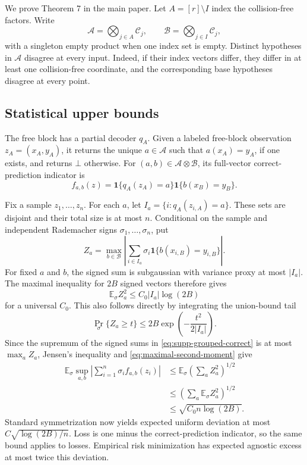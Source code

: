 \documentclass[twoside]{article}
\newcommand{\E}{\mathbb E}
\newcommand{\C}{\mathcal C}
\begin{document}
We prove Theorem 7 in the main paper. Let $A=[r]\setminus I$ index the collision-free factors. Write
\[
 \mathcal A=\bigotimes_{j\in A}\C_j,
 \qquad
 \mathcal B=\bigotimes_{j\in I}\C_j,
\]
with a singleton empty product when one index set is empty. Distinct hypotheses in $\mathcal A$ disagree at every input. Indeed, if their index vectors differ, they differ in at least one collision-free coordinate, and the corresponding base hypotheses disagree at every point.

\subsection{Statistical upper bounds}

The free block has a partial decoder $q_A$. Given a labeled free-block observation $z_A=(x_A,y_A)$, it returns the unique $a\in\mathcal A$ such that $a(x_A)=y_A$, if one exists, and returns $\bot$ otherwise. For $(a,b)\in\mathcal A\otimes\mathcal B$, its full-vector correct-prediction indicator is
\begin{equation}
 f_{a,b}(z)=\mathbf1\{q_A(z_A)=a\}\mathbf1\{b(x_B)=y_B\}.
 \label{eq:supp-grouped-correct}
\end{equation}

Fix a sample $z_1,\ldots,z_n$. For each $a$, let $I_a=\{i:q_A(z_{i,A})=a\}$. These sets are disjoint and their total size is at most $n$. Conditional on the sample and independent Rademacher signs $\sigma_1,\ldots,\sigma_n$, put
\[
 Z_a=\max_{b\in\mathcal B}
 \left|\sum_{i\in I_a}\sigma_i
 \mathbf1\{b(x_{i,B})=y_{i,B}\}\right|.
\]
For fixed $a$ and $b$, the signed sum is subgaussian with variance proxy at most $|I_a|$. The maximal inequality for $2B$ signed vectors therefore gives
\begin{equation}
 \E_\sigma Z_a^2\leq C_0|I_a|\log(2B)
 \label{eq:maximal-second-moment}
\end{equation}
for a universal $C_0$. This also follows directly by integrating the union-bound tail
\[
 \Pr_\sigma\{Z_a\geq t\}
 \leq 2B\exp\left(-\frac{t^2}{2|I_a|}\right).
\]
Since the supremum of the signed sums in \eqref{eq:supp-grouped-correct} is at most $\max_a Z_a$, Jensen's inequality and \eqref{eq:maximal-second-moment} give
\begin{align*}
 \E_\sigma\sup_{a,b}
 \left|\sum_{i=1}^n\sigma_i f_{a,b}(z_i)\right|
 &\leq \E_\sigma\left(\sum_a Z_a^2\right)^{1/2}\\
 &\leq\left(\sum_a\E_\sigma Z_a^2\right)^{1/2}\\
 &\leq\sqrt{C_0n\log(2B)}.
\end{align*}
Standard symmetrization now yields expected uniform deviation at most $C\sqrt{\log(2B)/n}$. Loss is one minus the correct-prediction indicator, so the same bound applies to losses. Empirical risk minimization has expected agnostic excess at most twice this deviation.
\end{document}
